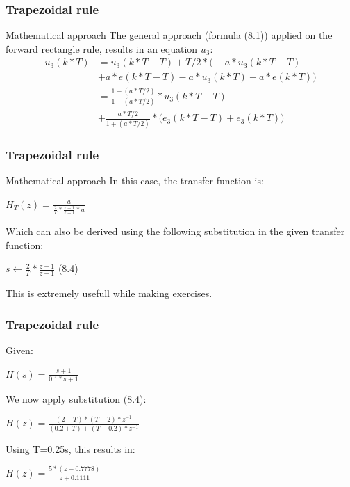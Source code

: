 \begin{frame}
	\frametitle{Trapezoidal rule}
	\begin{block}{Mathematical approach}
		The general approach (formula (8.1)) applied on the forward rectangle rule, results in an equation $u_3$:
		\begin{align*}
		u_3(k*T)& =u_3(k*T - T) + T/2*\big(-a*u_3(k*T - T)\\
		& + a*e(k*T - T) - a*u_3(k*T) + a*e(k*T)\big)\\
		& =\frac{1-(a*T/2)}{1 + (a*T/2)}*u_3(k*T - T)\\
		& +\frac{a*T/2}{1 + (a*T/2)} * \big(e_3(k*T - T) + e_3(k*T)\big)
		\end{align*}
	\end{block}
\end{frame}

\begin{frame}
	\frametitle{Trapezoidal rule}
	\begin{block}{Mathematical approach}
		In this case, the transfer function is:
		\begin{center}
			$H_T(z) = \frac{a}{\frac{2}{T}*\frac{z-1}{z+1} * a }$
		\end{center}
		Which can also be derived using the following substitution in the given transfer function:
		\begin{center}
			$s \gets \frac{2}{T} * \frac{z-1}{z+1}$ (8.4)
		\end{center}
		This is extremely usefull while making exercises.
	\end{block}
\end{frame}

\begin{frame}
	\frametitle{Trapezoidal rule}
	\begin{example}
		Given:
		\begin{center}
			$H(s) = \frac{s + 1}{0.1*s + 1}$
		\end{center}
		We now apply substitution (8.4):
		\begin{center}
			$H(z) = \frac{(2 + T)*(T - 2)*z^{-1}}{(0.2 + T) + (T - 0.2)*z^{-1}}$
		\end{center}
		Using T=0.25s, this results in:
		\begin{center}
			$H(z) = \frac{5*(z - 0.7778)}{z + 0.1111}$
		\end{center}
	\end{example}
\end{frame}

